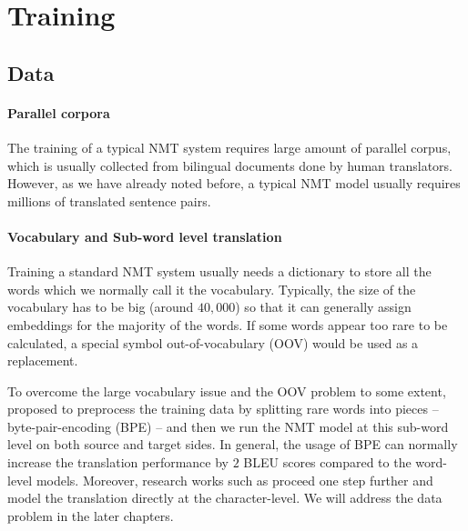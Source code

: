 
\section{Training}
\subsection{Data}
\paragraph{Parallel corpora} The training  of a typical NMT system requires large amount of parallel corpus, which is usually collected from bilingual documents done by human translators.  However, as we have already noted before, a typical NMT model usually requires millions of translated sentence pairs. 
\paragraph{Vocabulary and Sub-word level translation}  
Training a standard NMT system usually needs a dictionary to store all the words which we normally call it the vocabulary. Typically, the size of the vocabulary has to be big (around $40,000$) so that it can generally assign embeddings for the majority of the words. If some words appear too rare to be calculated, a special symbol out-of-vocabulary (OOV) would be used as a replacement. 

To overcome the large vocabulary issue and the OOV problem to some extent,  proposed to preprocess the training data by splitting rare words into pieces -- byte-pair-encoding (BPE) --  and then we run the NMT model at this sub-word level on both source and target sides. In general, the usage of BPE can normally increase the translation performance by $2$ BLEU scores compared to the word-level models. Moreover, research works such as  proceed one step further and model the translation directly at the character-level.
We will address the data problem in the later chapters.

